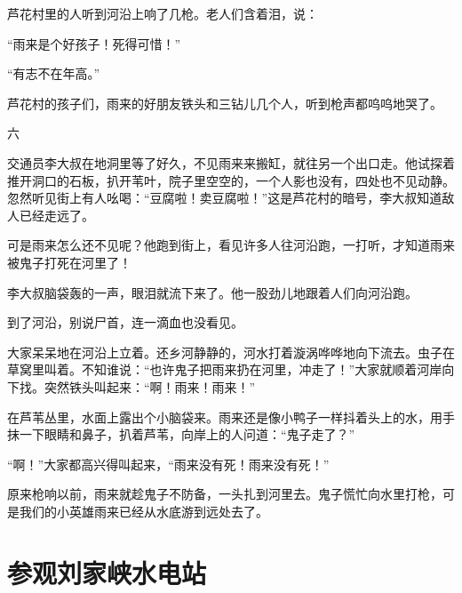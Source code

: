 \documentclass[12pt,UTF-8,openany]{ctexbook}
\begin{document}
\begin{Large}
    芦花村里的人听到河沿上响了几枪。老人们含着泪，说：
    
    “雨来是个好孩子！死得可惜！”
    
    “有志不在年高。”
    
    芦花村的孩子们，雨来的好朋友铁头和三钻儿几个人，听到枪声都呜呜地哭了。
    
    六
    
    交通员李大叔在地洞里等了好久，不见雨来来搬缸，就往另一个出口走。他试探着推开洞口的石板，扒开苇叶，院子里空空的，一个人影也没有，四处也不见动静。忽然听见街上有人吆喝：“豆腐啦！卖豆腐啦！”这是芦花村的暗号，李大叔知道敌人已经走远了。
    
    可是雨来怎么还不见呢？他跑到街上，看见许多人往河沿跑，一打听，才知道雨来被鬼子打死在河里了！
    
    李大叔脑袋轰的一声，眼泪就流下来了。他一股劲儿地跟着人们向河沿跑。
    
    到了河沿，别说尸首，连一滴血也没看见。
    
    大家呆呆地在河沿上立着。还乡河静静的，河水打着漩涡哗哗地向下流去。虫子在草窝里叫着。不知谁说：“也许鬼子把雨来扔在河里，冲走了！”大家就顺着河岸向下找。突然铁头叫起来：“啊！雨来！雨来！”
    
    在芦苇丛里，水面上露出个小脑袋来。雨来还是像小鸭子一样抖着头上的水，用手抹一下眼睛和鼻子，扒着芦苇，向岸上的人问道：“鬼子走了？”
    
    “啊！”大家都高兴得叫起来，“雨来没有死！雨来没有死！”
    
    原来枪响以前，雨来就趁鬼子不防备，一头扎到河里去。鬼子慌忙向水里打枪，可是我们的小英雄雨来已经从水底游到远处去了。
    
\end{Large}

\chapter{参观刘家峡水电站}
\end{document}
